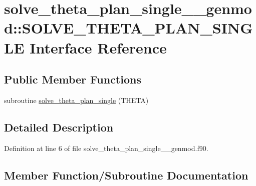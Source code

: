 \hypertarget{interfacesolve__theta__plan__single____genmod_1_1_s_o_l_v_e___t_h_e_t_a___p_l_a_n___s_i_n_g_l_e}{}\section{solve\+\_\+theta\+\_\+plan\+\_\+single\+\_\+\+\_\+genmod\+::S\+O\+L\+V\+E\+\_\+\+T\+H\+E\+T\+A\+\_\+\+P\+L\+A\+N\+\_\+\+S\+I\+N\+G\+LE Interface Reference}
\label{interfacesolve__theta__plan__single____genmod_1_1_s_o_l_v_e___t_h_e_t_a___p_l_a_n___s_i_n_g_l_e}
\subsection*{Public Member Functions}
\begin{DoxyCompactItemize}
\item 
subroutine \mbox{\hyperlink{interfacesolve__theta__plan__single____genmod_1_1_s_o_l_v_e___t_h_e_t_a___p_l_a_n___s_i_n_g_l_e_afa3b9e3a81656987ab2056d5e243c4a0}{solve\+\_\+theta\+\_\+plan\+\_\+single}} (T\+H\+E\+TA)
\end{DoxyCompactItemize}


\subsection{Detailed Description}


Definition at line 6 of file solve\+\_\+theta\+\_\+plan\+\_\+single\+\_\+\+\_\+genmod.\+f90.



\subsection{Member Function/\+Subroutine Documentation}
\mbox{\label{interfacesolve__theta__plan__single____genmod_1_1_s_o_l_v_e___t_h_e_t_a___p_l_a_n___s_i_n_g_l_e_afa3b9e3a81656987ab2056d5e243c4a0}} 
